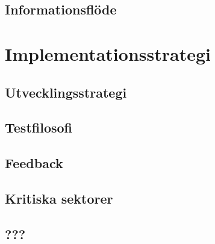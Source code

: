 \documentclass{article}
\begin{document}
\subsection{Informationsflöde}

\clearpage

\section{Implementationsstrategi}

\subsection{Utvecklingsstrategi}

\subsection{Testfilosofi}

\subsection{Feedback}

\subsection{Kritiska sektorer}

\subsection{???}

\clearpage

\nocite{*}
{}

\end{document}
